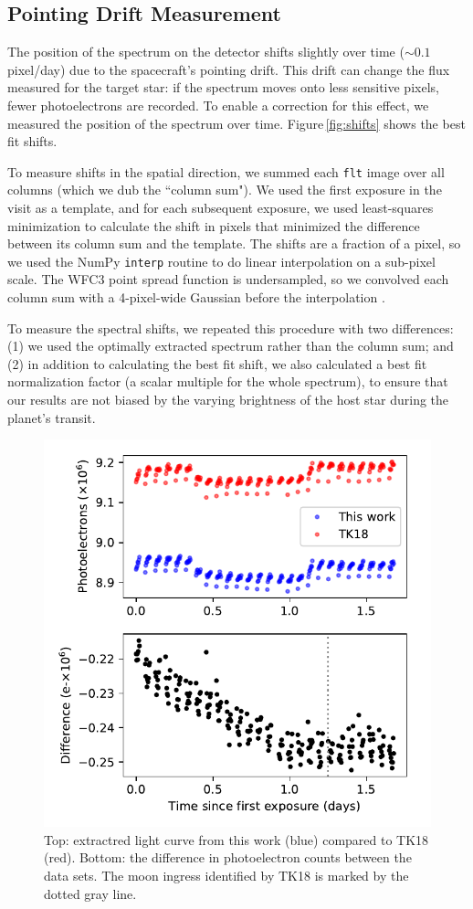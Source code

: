 \documentclass[twocolumn]{aastex62}
\begin{document}
\subsection{Pointing Drift Measurement}
The position of the spectrum on the detector shifts slightly over time ($\sim0.1$ pixel/day) due to the spacecraft's pointing drift. This drift can change the flux measured for the target star: if the spectrum moves onto less sensitive pixels, fewer photoelectrons are recorded. To enable a correction for this effect, we measured the position of the spectrum over time.  Figure\,\ref{fig:shifts} shows the best fit shifts. 

To measure shifts in the spatial direction, we summed each \texttt{flt} image over all columns (which we dub the ``column sum"). We used the first exposure in the visit as a template, and for each subsequent exposure, we used least-squares minimization to calculate the shift in pixels that minimized the difference between its column sum and the template. The shifts are a fraction of a pixel, so we used the NumPy \texttt{interp} routine to do linear interpolation on a sub-pixel scale. The WFC3 point spread function is undersampled, so we convolved each column sum with a 4-pixel-wide Gaussian  before the interpolation \citep[following][]{deming13}.  

To measure the spectral shifts, we repeated this procedure with two differences: (1) we used the optimally extracted spectrum rather than the column sum; and (2) in addition to calculating the best fit shift, we also calculated a best fit normalization factor (a scalar multiple for the whole spectrum), to ensure that our results are not biased by the varying brightness of the host star during the planet's transit. 


\begin{figure}
\includegraphics[width = 0.5 \textwidth]{figures/fig6_rawdata.pdf}
    \caption{Top: extractred light curve from this work (blue) compared to TK18 (red). Bottom: the difference in photoelectron counts between the data sets. The moon ingress identified by TK18 is marked by the dotted gray line.}
\label{fig:raw}
\end{figure}
\end{document}
